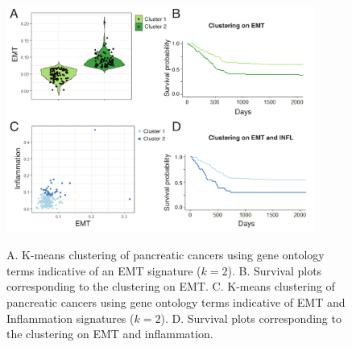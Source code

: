 \documentclass[11pt]{article}
\begin{document}
\begin{figure}
\center
{\includegraphics[width=0.9\textwidth]{FigTCGA.pdf}}
\caption{A. K-means clustering of pancreatic cancers using gene ontology terms indicative of an EMT signature ($k=2$). B. Survival plots corresponding to the clustering on EMT. C. K-means clustering of pancreatic cancers using gene ontology terms indicative of EMT and Inflammation signatures ($k=2$). D. Survival plots corresponding to the clustering on EMT and inflammation.}
\label{fig:tcga}
\end{figure}



\end{document}
